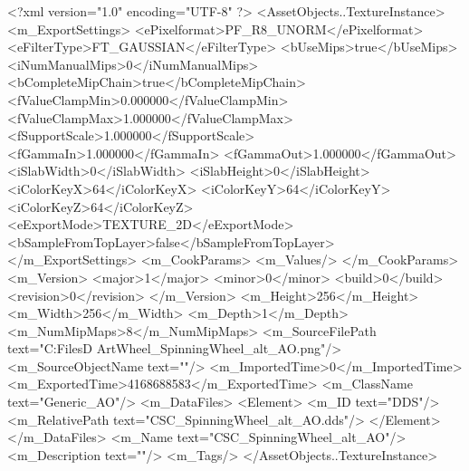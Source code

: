 <?xml version="1.0" encoding="UTF-8" ?>
<AssetObjects..TextureInstance>
	<m_ExportSettings>
		<ePixelformat>PF_R8_UNORM</ePixelformat>
		<eFilterType>FT_GAUSSIAN</eFilterType>
		<bUseMips>true</bUseMips>
		<iNumManualMips>0</iNumManualMips>
		<bCompleteMipChain>true</bCompleteMipChain>
		<fValueClampMin>0.000000</fValueClampMin>
		<fValueClampMax>1.000000</fValueClampMax>
		<fSupportScale>1.000000</fSupportScale>
		<fGammaIn>1.000000</fGammaIn>
		<fGammaOut>1.000000</fGammaOut>
		<iSlabWidth>0</iSlabWidth>
		<iSlabHeight>0</iSlabHeight>
		<iColorKeyX>64</iColorKeyX>
		<iColorKeyY>64</iColorKeyY>
		<iColorKeyZ>64</iColorKeyZ>
		<eExportMode>TEXTURE_2D</eExportMode>
		<bSampleFromTopLayer>false</bSampleFromTopLayer>
	</m_ExportSettings>
	<m_CookParams>
		<m_Values/>
	</m_CookParams>
	<m_Version>
		<major>1</major>
		<minor>0</minor>
		<build>0</build>
		<revision>0</revision>
	</m_Version>
	<m_Height>256</m_Height>
	<m_Width>256</m_Width>
	<m_Depth>1</m_Depth>
	<m_NumMipMaps>8</m_NumMipMaps>
	<m_SourceFilePath text="C:\Users\Shadow\Desktop\Working Files\3D Art\Props\Tailors\Spinning Wheel\CSC_SpinningWheel_alt_AO.png"/>
	<m_SourceObjectName text=""/>
	<m_ImportedTime>0</m_ImportedTime>
	<m_ExportedTime>4168688583</m_ExportedTime>
	<m_ClassName text="Generic_AO"/>
	<m_DataFiles>
		<Element>
			<m_ID text="DDS"/>
			<m_RelativePath text="CSC_SpinningWheel_alt_AO.dds"/>
		</Element>
	</m_DataFiles>
	<m_Name text="CSC_SpinningWheel_alt_AO"/>
	<m_Description text=""/>
	<m_Tags/>
</AssetObjects..TextureInstance>

